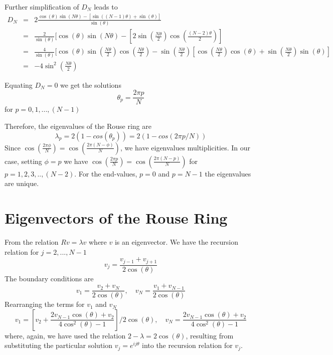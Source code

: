 \documentclass[12pt]{report}
\begin{document}
Further simplification of $D_N$ leads to 
\begin{eqnarray*}
D_N &=& 2\frac{\cos(\theta)\sin(N\theta)-[\sin((N-1)\theta)+\sin(\theta)]}{\sin(\theta)}\\
    &=& \frac{2}{\sin(\theta)}[\cos(\theta)\sin(N\theta)-[2\sin(\frac{N\theta}{2})\cos(\frac{(N-2)\theta}{2})]\\
    &=& \frac{4}{\sin(\theta)}[\cos(\theta)\sin(\frac{N\theta}{2})\cos(\frac{N\theta}{2})-\sin(\frac{N\theta}{2})[\cos(\frac{N\theta}{2})\cos(\theta)+\sin(\frac{N\theta}{2})\sin(\theta)]\\
    &=& -4\sin^2(\frac{N\theta}{2})
\end{eqnarray*}

Equating $D_N=0$ we get the solutions
\begin{equation*}
\theta_p=\frac{2\pi p}{N}
\end{equation*}
for $p=0,1,...,(N-1)$

Therefore, the eigenvalues of the Rouse ring are 
\begin{equation*}
\lambda_p=2(1-cos(\theta_p))= 2(1-cos(2\pi p/N))
\end{equation*}
Since $\cos(\frac{2\pi \phi}{N})=\cos(\frac{2\pi(N-\phi)}{N})$, we have eigenvalues multiplicities. In our case, setting $\phi=p$ we have $\cos(\frac{2\pi p}{N})=\cos(\frac{2\pi(N-p)}{N})$ for $p=1,2,3,..,(N-2)$. For the end-values, $p=0$ and $p=N-1$ the eigenvalues are unique. 

\section{Eigenvectors of the Rouse Ring}\label{eigenvectorsOfTheRouseRing}
From the relation $Rv=\lambda v$ where $v$  is an eigenvector.
We have the recursion relation for $j=2,...,N-1$
\begin{equation*}
v_j = \frac{v_{j-1}+v_{j+1}}{2\cos(\theta)}
\end{equation*}
The boundary conditions are 
\begin{equation*}
v_1 = \frac{v_2+v_N}{2\cos(\theta)},\quad v_N = \frac{v_1+v_{N-1}}{2\cos(\theta)}
\end{equation*}
Rearranging the terms for $v_1$ and $v_N$
\begin{equation*}
v_1 = \left[v_2+\frac{2v_{N-1}\cos(\theta)+v_2}{4\cos^2(\theta)-1}\right]/2\cos(\theta),\quad v_N = \frac{2v_{N-1}\cos(\theta)+v_2}{4\cos^2(\theta)-1}
\end{equation*}
where, again, we have used the relation $2-\lambda = 2\cos(\theta)$, resulting from substituting the particular solution $v_j=e^{ij\theta}$ into the recursion relation for $v_j$. 
\end{document}
